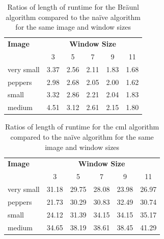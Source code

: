 \begin{table}
\centering
\begin{tabular}{@{}lccccc@{}}
\toprule
\textbf{Image} & \multicolumn{5}{c}{\textbf{Window Size}} \\
               & 3      & 5      & 7      & 9     & 11    \\ \midrule
very small     & 3.37   & 2.56   & 2.11   & 1.83  & 1.68  \\
peppers        & 2.98   & 2.68   & 2.05   & 2.00     & 1.62  \\
small          & 3.32   & 2.86   & 2.21   & 2.04  & 1.83  \\
medium         & 4.51   & 3.12   & 2.61   & 2.15  & 1.80   \\ \bottomrule
\end{tabular}
\caption[Ratios runtime for the Bräunl algorithm vs the naïve algorithm]{Ratios of length of runtime for the Bräunl algorithm compared to the naïve algorithm for the same image and window sizes}
\label{tab:median:ratbraun}
\end{table}

\begin{table}
\centering
\caption[Ratios of runtime for the  algorithm compared to the naïve algorithm]{Ratios of length of runtime for the \gls{cml} algorithm compared to the naïve algorithm for the same image and window sizes}
\label{tab:median:ratcml}
\begin{tabular}{@{}lccccc@{}}
\toprule
\textbf{Image} & \multicolumn{5}{c}{\textbf{Window Size}} \\
               & 3      & 5      & 7      & 9     & 11    \\ \midrule
very small     & 31.18  & 29.75  & 28.08  & 23.98 & 26.97 \\
peppers        & 21.73  & 30.29  & 30.83  & 32.49 & 30.74 \\
small          & 24.12  & 31.39  & 34.15  & 34.15 & 35.17 \\
medium         & 34.65  & 38.19  & 38.61  & 38.45 & 41.29 \\ \bottomrule
\end{tabular}
\end{table}

